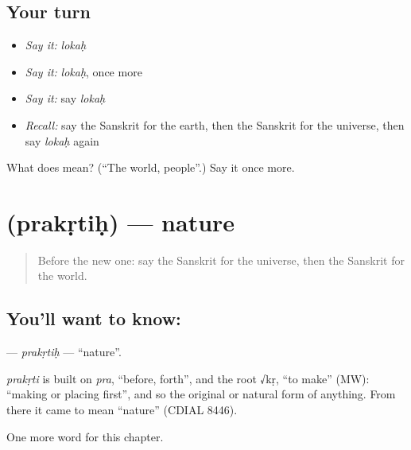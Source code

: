 \subsection*{Your turn}
\begin{itemize}
\raggedright
  \item \emph{Say it:} \emph{lokaḥ}
  \item \emph{Say it:} \emph{lokaḥ}, once more
  \item \emph{Say it:} say \emph{lokaḥ}
  \item \emph{Recall:} say the Sanskrit for the earth, then the Sanskrit for the universe, then say \emph{lokaḥ} again
\end{itemize}

\begin{tcolorbox}[breakable,colback=teal!4,colframe=teal!35!black,title={Before you move on}]
What does  mean? (\textquotedblleft{}The world, people\textquotedblright{}.) Say it once more.
\end{tcolorbox}
\section[\texorpdfstring{\sk{प्रकृतिः} (prakṛtiḥ)}{प्रकृतिः (prakṛtiḥ)}]{ (prakṛtiḥ) — nature}

\label{lesson:SA-C251-prakrtih}



\begin{quote}
Before the new one: say the Sanskrit for the universe, then the Sanskrit for the world.
\end{quote}

\subsection*{You'll want to know: }
\textbf{} — \emph{prakṛtiḥ} — \textquotedblleft{}nature\textquotedblright{}.

\begin{cousinweb}
\emph{prakṛti} is built on \emph{pra}, \textquotedblleft{}before, forth\textquotedblright{}, and the root √kṛ, \textquotedblleft{}to make\textquotedblright{} (MW): \textquotedblleft{}making or placing first\textquotedblright{}, and so the original or natural form of anything. From there it came to mean \textquotedblleft{}nature\textquotedblright{} (CDIAL 8446).
\end{cousinweb}

\begin{grammarlens}[title={What you've built}]
One more word for this chapter.
\end{grammarlens}

